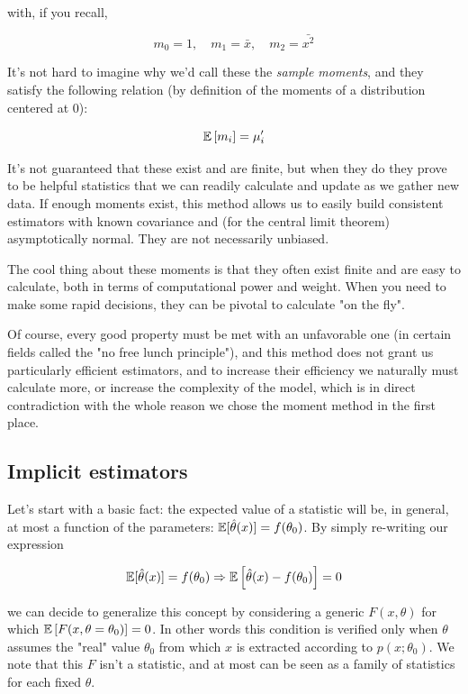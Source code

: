 with, if you recall,

	\[
	m_0 = 1,\quad m_1=\bar{x}, \quad m_2 = \bar{x^2}
	\]
	
It's not hard to imagine why we'd call these the \emph{sample moments}, and they satisfy the following relation (by definition of the moments of a distribution centered at $0$):

	\[
	\mathbb{E}\left[m_i\right] = \mu_i^\prime
	\]

It's not guaranteed that these exist and are finite, but when they do they prove to be helpful statistics that we can readily calculate and update as we gather new data. If enough moments exist, this method allows us to easily build consistent estimators with known covariance and (for the central limit theorem) asymptotically normal. They are not necessarily unbiased.

The cool thing about these moments is that they often exist finite and are easy to calculate, both in terms of computational power and weight. When you need to make some rapid decisions, they can be pivotal to calculate "on the fly". 

Of course, every good property must be met with an unfavorable one (in certain fields called the "no free lunch principle"), and this method does not grant us particularly efficient estimators, and to increase their efficiency we naturally must calculate more, or increase the complexity of the model, which is in direct contradiction with the whole reason we chose the moment method in the first place.

\subsection{Implicit estimators}
\label{subsec:Implicits}
Let's start with a basic fact: the expected value of a statistic will be, in general, at most a function of the parameters: $\mathbb{E}[\hat\theta(x)]  = f(\theta_0)$. By simply re-writing our expression

	\[
	\mathbb{E}[\hat\theta(x)]  = f(\theta_0) \Rightarrow \mathbb{E}\left[\hat\theta(x)-f(\theta_0)\right] = 0
	\]

we can decide to generalize this concept by considering a generic $F(x,\theta)$ for which $\mathbb{E}\left[F(x,\theta=\theta_0)\right]=0$. In other words this condition is verified only when $\theta$ assumes the "real" value $\theta_0$ from which $x$ is extracted according to $p(x;\theta_0)$. We note that this $F$ isn't a statistic, and at most can be seen as a family of statistics for each fixed $\theta$. 

